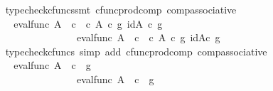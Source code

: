 \begin{isabellebody}
\ \ \ \ \ \ \ \ \ \ \ \ \ \ \ \ \isamarkupfalse%
\ {\isacharparenleft}{\kern0pt}typecheck{\isacharunderscore}{\kern0pt}cfuncs{\isacharcomma}{\kern0pt}smt\ cfunc{\isacharunderscore}{\kern0pt}prod{\isacharunderscore}{\kern0pt}comp\ comp{\isacharunderscore}{\kern0pt}associative{}{\isacharparenright}{\kern0pt}\isanewline
\ \ \ \ \ \ \ \ \ \ \ \ \ \ \isamarkupfalse%
\ \isamarkupfalse%
\ {\isachardoublequoteopen}{\isachardot}{\kern0pt}{\isachardot}{\kern0pt}{\isachardot}{\kern0pt}\ {\isacharequal}{\kern0pt}\ {\isasymlangle}eval{\isacharunderscore}{\kern0pt}func\ A\ {\isasymOmega}\ {\isasymcirc}\isactrlsub c\ {\isasymlangle}{\isasymt}\ {\isasymcirc}\isactrlsub c\ {\isasymbeta}\isactrlbsub A\isactrlbsup {\isasymOmega}\isactrlesup \isactrlesub \ {\isasymcirc}\isactrlsub c\ g{\isacharcomma}{\kern0pt}\ id{\isacharparenleft}{\kern0pt}A\isactrlbsup {\isasymOmega}\isactrlesup {\isacharparenright}{\kern0pt}\ {\isasymcirc}\isactrlsub c\ g{\isasymrangle}{\isacharcomma}{\kern0pt}\isanewline
\ \ \ \ \ \ \ \ \ \ \ \ \ \ \ \ \ \ \ \ \ \ \ \ \ \ \ \ \ \ \ \ eval{\isacharunderscore}{\kern0pt}func\ A\ {\isasymOmega}\ {\isasymcirc}\isactrlsub c\ {\isasymlangle}{\isasymf}\ {\isasymcirc}\isactrlsub c\ {\isasymbeta}\isactrlbsub A\isactrlbsup {\isasymOmega}\isactrlesup \isactrlesub \ {\isasymcirc}\isactrlsub c\ g{\isacharcomma}{\kern0pt}\ id{\isacharparenleft}{\kern0pt}A\isactrlbsup {\isasymOmega}\isactrlesup {\isacharparenright}{\kern0pt}{\isasymcirc}\isactrlsub c\ g\ {\isasymrangle}{\isasymrangle}{\isachardoublequoteclose}\isanewline
\ \ \ \ \ \ \ \ \ \ \ \ \ \ \ \ \isamarkupfalse%
\ {\isacharparenleft}{\kern0pt}typecheck{\isacharunderscore}{\kern0pt}cfuncs{\isacharcomma}{\kern0pt}\ simp\ add{\isacharcolon}{\kern0pt}\ cfunc{\isacharunderscore}{\kern0pt}prod{\isacharunderscore}{\kern0pt}comp\ comp{\isacharunderscore}{\kern0pt}associative{}{\isacharparenright}{\kern0pt}\isanewline
\ \ \ \ \ \ \ \ \ \ \ \ \ \ \isamarkupfalse%
\ \isamarkupfalse%
\ {\isachardoublequoteopen}{\isachardot}{\kern0pt}{\isachardot}{\kern0pt}{\isachardot}{\kern0pt}\ {\isacharequal}{\kern0pt}\ {\isasymlangle}eval{\isacharunderscore}{\kern0pt}func\ A\ {\isasymOmega}\ {\isasymcirc}\isactrlsub c\ {\isasymlangle}{\isasymt}{\isacharcomma}{\kern0pt}\ g{\isasymrangle}{\isacharcomma}{\kern0pt}\isanewline
\ \ \ \ \ \ \ \ \ \ \ \ \ \ \ \ \ \ \ \ \ \ \ \ \ \ \ \ \ \ \ \ eval{\isacharunderscore}{\kern0pt}func\ A\ {\isasymOmega}\ {\isasymcirc}\isactrlsub c\ {\isasymlangle}{\isasymf}{\isacharcomma}{\kern0pt}\ g{\isasymrangle}{\isasymrangle}{\isachardoublequoteclose}\ \ \ \ \isanewline

\end{isabellebody}
